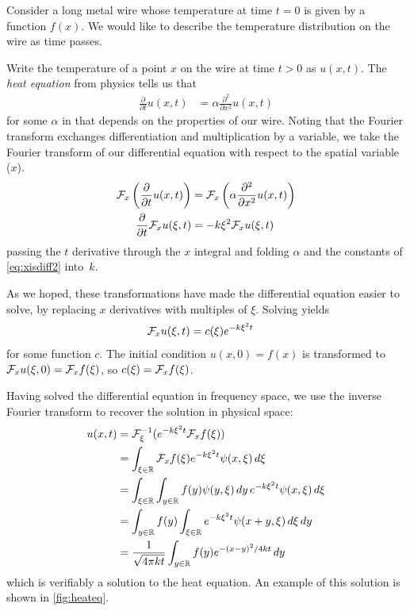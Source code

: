       \begin{example}
        \label{ex:heateq}
        Consider a long metal wire whose temperature at time $t=0$ is given by a function $f(x)$.
        We would like to describe the temperature distribution on the wire as time passes.

        Write the temperature of a point $x$ on the wire at time $t>0$ as $u(x,t)$.
        The \emph{heat equation} from physics tells us that
        \begin{align*}
          \frac{\partial}{\partial t}u(x,t) &= \alpha\frac{\partial^2}{\partial x^2}u(x,t)
        \end{align*}
        for some $\alpha$ in \R that depends on the properties of our wire. 
        Noting that the Fourier transform exchanges differentiation and multiplication by a variable, we take the Fourier transform of our differential equation with respect to the spatial variable ($x$).
        \begin{align*}
          \mathcal{F}_x\left(\frac{\partial}{\partial t}u(x,t)\right) &= \mathcal{F}_x\left(\alpha\frac{\partial^2}{\partial x^2}u(x,t)\right)\\
          \frac{\partial}{\partial t}\mathcal{F}_xu(\xi,t) &= -k\xi^2\mathcal{F}_xu(\xi,t)
        \end{align*}
        passing the $t$ derivative through the $x$ integral and folding $\alpha$ and the constants of \cref{eq:xisdiff2} into~$k$.

        As we hoped, these transformations have made the differential equation easier to solve, by replacing $x$ derivatives with multiples of $\xi$.
        Solving yields
        \begin{align*}
          \mathcal{F}_xu(\xi,t) &= c(\xi)e^{-k\xi^2t}
        \end{align*}
        for some function $c$.
        The initial condition $u(x,0)=f(x)$ is transformed to $\mathcal{F}_xu(\xi,0) = \mathcal{F}_x f(\xi)$, so $c(\xi)=\mathcal{F}_x f(\xi)$.

        Having solved the differential equation in frequency space, we use the inverse Fourier transform to recover the solution in physical space:
        \begin{align}
          \notag u(x,t) &= \mathcal{F}^{-1}_\xi(e^{-k\xi^2t}\mathcal{F}_x f(\xi))\\
          \notag &= \int_{\xi\in\mathbb{R}} \mathcal{F}_x f(\xi)e^{-k\xi^2t}\psi(x,\xi)\,d\xi\\
          \notag &= \int_{\xi\in\mathbb{R}} \int_{y\in\mathbb{R}} f(y)\psi(y,\xi)\,dy\,e^{-k\xi^2t}\psi(x,\xi)\,d\xi\\
          \notag &= \int_{y\in\mathbb{R}} f(y) \int_{\xi\in\mathbb{R}} e^{-k\xi^2t}\psi(x+y,\xi)\,d\xi\,dy\\
          \label{eq:heatsoln} &= \frac{1}{\sqrt{4\pi kt}}\int_{y\in\mathbb{R}} f(y)e^{-(x-y)^2/4kt}\,dy
        \end{align}
        which is verifiably a solution to the heat equation.
        An example of this solution is shown in \cref{fig:heateq}.


\end{example}
